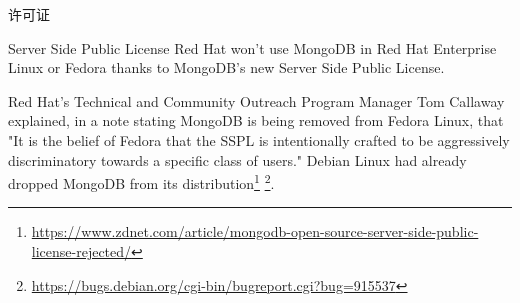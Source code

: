 \documentclass{beamer}
\begin{document}
\begin{frame}[t]{许可证}
	\begin{block}{Server Side Public License}
		Red Hat won't use MongoDB in Red Hat Enterprise Linux or Fedora thanks to MongoDB's new Server Side Public License.

		Red Hat's Technical and Community Outreach Program Manager Tom Callaway explained, in a note stating MongoDB is being removed from Fedora Linux, that "It is the belief of Fedora that the SSPL is intentionally crafted to be aggressively discriminatory towards a specific class of users." Debian Linux had already dropped MongoDB from its distribution\footnote{\url{https://www.zdnet.com/article/mongodb-open-source-server-side-public-license-rejected/}} \footnote{\url{https://bugs.debian.org/cgi-bin/bugreport.cgi?bug=915537}}. 
	\end{block}
\end{frame}
\end{document}
